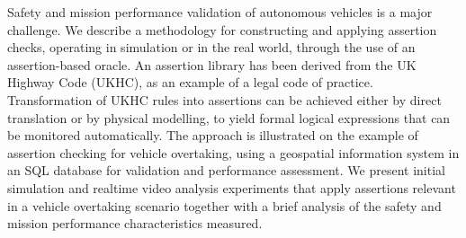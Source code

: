 Safety and mission performance validation of autonomous vehicles is a major challenge. We describe a methodology for constructing and applying assertion checks, operating in simulation or in the real world, through the use of an assertion-based oracle. 
%
An assertion library has been derived from the UK Highway Code (UKHC), as an example of a legal code of practice. 
%
Transformation of UKHC rules into assertions can be achieved either by direct translation or by physical modelling, to yield formal logical expressions that can be monitored automatically.
%
The approach is illustrated on the example of assertion checking for vehicle overtaking, using a geospatial information system in an SQL database for validation and performance assessment.
%
We present initial simulation and realtime video analysis experiments that apply assertions relevant in a vehicle overtaking scenario together with a brief analysis of the safety and mission performance characteristics measured.
%
